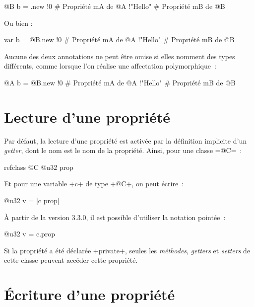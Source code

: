\begin{galgas4}
@B b = .new {
  !0 # Propriété mA de @A
  !"Hello" # Propriété mB de @B
}
\end{galgas4}

Ou bien :
\begin{galgas4}
var b = @B.new {
  !0 # Propriété mA de @A
  !"Hello" # Propriété mB de @B
}
\end{galgas4}

Aucune des deux annotations ne peut être omise si elles nomment des types différents, comme lorsque l'on réalise une affectation polymorphique~:

\begin{galgas4}
@A b = @B.new {
  !0 # Propriété mA de @A
  !"Hello" # Propriété mB de @B
}
\end{galgas4}








\section{Lecture d'une propriété}

Par défaut, la lecture d'une propriété est activée par la définition implicite d'un \emph{getter}, dont le nom est le nom de la propriété. Ainsi, pour une classe \ggsq=@C=~:

\begin{galgas4}
refclass @C {
  @u32 prop
}
\end{galgas4}

Et pour une variable \ggsq+c+ de type \ggsq+@C+, on peut écrire~:

\begin{galgas4}
@u32 v = [c prop]
\end{galgas4}

À partir de la version 3.3.0, il est possible d'utiliser la notation pointée~:
\begin{galgas4}
@u32 v = c.prop
\end{galgas4}

Si la propriété a été déclarée \ggsq+private+, seules les \emph{méthodes}, \emph{getters} et \emph{setters} de cette classe peuvent accéder cette propriété.








\section{Écriture d'une propriété}

